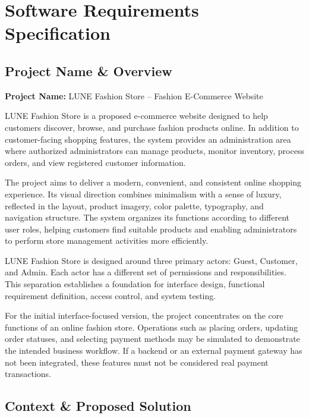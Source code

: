 \documentclass[12pt,a4paper,oneside]{report}
\begin{document}
\chapter{Software Requirements Specification}

\section{Project Name \& Overview}
\textbf{Project Name:} LUNE Fashion Store -- Fashion E-Commerce Website

LUNE Fashion Store is a proposed e-commerce website designed to help customers discover, browse, and purchase fashion products online. In addition to customer-facing shopping features, the system provides an administration area where authorized administrators can manage products, monitor inventory, process orders, and view registered customer information.

The project aims to deliver a modern, convenient, and consistent online shopping experience. Its visual direction combines minimalism with a sense of luxury, reflected in the layout, product imagery, color palette, typography, and navigation structure. The system organizes its functions according to different user roles, helping customers find suitable products and enabling administrators to perform store management activities more efficiently.

LUNE Fashion Store is designed around three primary actors: Guest, Customer, and Admin. Each actor has a different set of permissions and responsibilities. This separation establishes a foundation for interface design, functional requirement definition, access control, and system testing.

For the initial interface-focused version, the project concentrates on the core functions of an online fashion store. Operations such as placing orders, updating order statuses, and selecting payment methods may be simulated to demonstrate the intended business workflow. If a backend or an external payment gateway has not been integrated, these features must not be considered real payment transactions.

\section{Context \& Proposed Solution}
\end{document}
